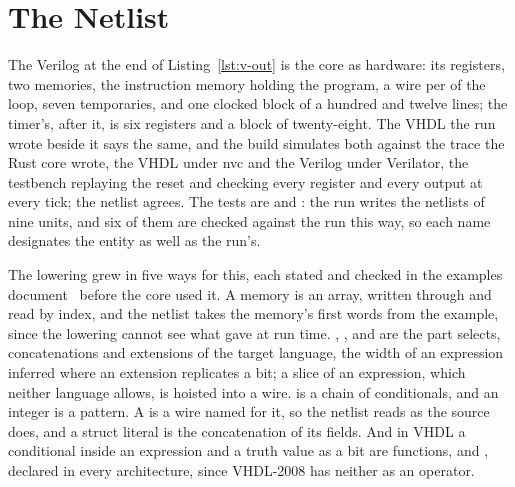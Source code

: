\documentclass[journal,onecolumn,9pt]{IEEEtran}
\begin{document}


\section{The Netlist}
\label{sec:v-netlist}

The Verilog at the end of Listing~\ref{lst:v-out} is the core as
hardware: its registers, two memories, the instruction
memory holding the program, a wire per  of the loop, seven
temporaries, and one clocked block of a hundred and twelve lines;
the timer's, after it, is six registers and a block of twenty-eight.
The VHDL the run
wrote beside it says the same, and the build simulates both against
the trace the Rust core wrote, the VHDL under nvc and the Verilog
under Verilator, the testbench replaying the reset and checking every
register and every output at every tick; the netlist agrees. The
tests are 
and : the run writes the
netlists of nine units, and six of them are checked against the run
this way, so each name designates the entity as well as the run's.

The lowering grew in five ways for this, each stated and checked in
the examples document~\cite{examples} before the core used it. A
memory is an array, written through  and read by index, and
the netlist takes the memory's first words from the example, since
the lowering cannot see what  gave at run time.
, ,  and  are the
part selects, concatenations and extensions of the target language,
the width of an expression inferred where an extension replicates a
bit; a slice of an expression, which neither language allows, is
hoisted into a wire.  is a chain of conditionals, and
an integer is a pattern. A  is a wire named for it, so the
netlist reads as the source does, and a struct literal is the
concatenation of its fields. And in VHDL a conditional inside an
expression and a truth value as a bit are functions,  and
, declared in every architecture, since VHDL-2008 has
neither as an operator.
\end{document}
